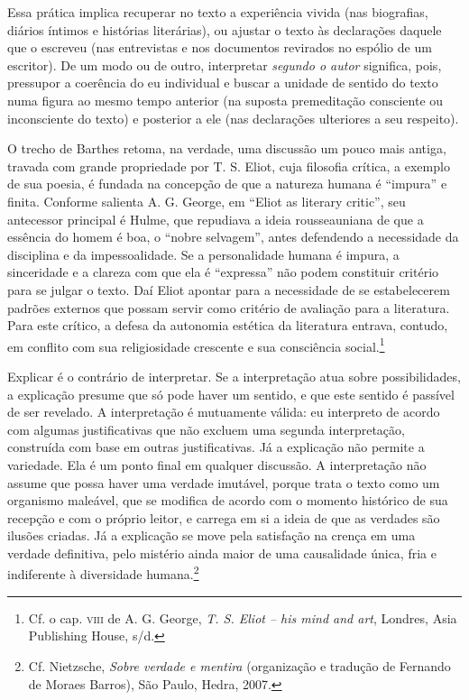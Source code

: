 Essa prática implica recuperar no texto a experiência vivida (nas
biografias, diários íntimos e histórias literárias), ou ajustar o texto
às declarações daquele que o escreveu (nas entrevistas e nos documentos
revirados no espólio de um escritor). De um modo ou de outro,
interpretar \emph{segundo o autor} significa, pois, pressupor a coerência do eu
individual e buscar a unidade de sentido do texto numa figura ao mesmo
tempo anterior (na suposta premeditação consciente ou inconsciente do
texto) e posterior a ele (nas declarações ulteriores a seu respeito).

O trecho de Barthes retoma, na verdade, uma discussão um pouco mais
antiga, travada com grande propriedade por T. S. Eliot, cuja filosofia
crítica, a exemplo de sua poesia, é fundada na concepção de que a
natureza humana é ``impura'' e finita. Conforme salienta A. G. George,
em ``Eliot as literary critic'', seu antecessor principal é Hulme, que
repudiava a ideia rousseauniana de que a essência do homem é boa, o
``nobre selvagem'', antes defendendo a necessidade da disciplina e da
impessoalidade. Se a personalidade humana é impura, a sinceridade e a
clareza com que ela é ``expressa'' não podem constituir critério para se
julgar o texto. Daí Eliot apontar para a necessidade de se estabelecerem
padrões externos que possam servir como critério de avaliação para a
literatura. Para este crítico, a defesa da autonomia estética da
literatura entrava, contudo, em conflito com sua religiosidade crescente
e sua consciência social.\footnote{Cf. o cap. \textsc{viii} de A. G.
  George, \emph{T. S. Eliot -- his mind and art}, Londres, Asia
  Publishing House, s/d.}

Explicar é o contrário de interpretar. Se a interpretação atua sobre
possibilidades, a explicação presume que só pode haver um sentido, e que
este sentido é passível de ser revelado. A interpretação é mutuamente
válida: eu interpreto de acordo com algumas justificativas que não
excluem uma segunda interpretação, construída com base em outras
justificativas. Já a explicação não permite a variedade. Ela é um ponto
final em qualquer discussão. A interpretação não assume que possa haver
uma verdade imutável, porque trata o texto como um organismo maleável,
que se modifica de acordo com o momento histórico de sua recepção e com
o próprio leitor, e carrega em si a ideia de que as verdades são ilusões
criadas. Já a explicação se move pela satisfação na crença em uma
verdade definitiva, pelo mistério ainda maior de uma causalidade única,
fria e indiferente à diversidade humana.\footnote{Cf. Nietzsche,
  \emph{Sobre verdade e mentira} (organização e tradução de Fernando de
  Moraes Barros), São Paulo, Hedra, 2007.}

